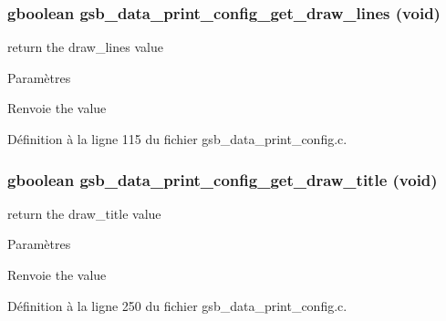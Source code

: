 \subsubsection[{gsb\_\-data\_\-print\_\-config\_\-get\_\-draw\_\-lines}]{\setlength{\rightskip}{0pt plus 5cm}gboolean gsb\_\-data\_\-print\_\-config\_\-get\_\-draw\_\-lines (void)}\label{gsb__data__print__config_8c_a6214f4edbeb618543155d93c1440fb13}
return the draw\_\-lines value


\begin{DoxyParams}{Paramètres}
\item[{\em }]\end{DoxyParams}
\begin{DoxyReturn}{Renvoie}
the value 
\end{DoxyReturn}


Définition à la ligne 115 du fichier gsb\_\-data\_\-print\_\-config.c.

\subsubsection[{gsb\_\-data\_\-print\_\-config\_\-get\_\-draw\_\-title}]{\setlength{\rightskip}{0pt plus 5cm}gboolean gsb\_\-data\_\-print\_\-config\_\-get\_\-draw\_\-title (void)}\label{gsb__data__print__config_8c_afd8a78e043b717e6bc2a6a18b6ced76d}
return the draw\_\-title value


\begin{DoxyParams}{Paramètres}
\item[{\em }]\end{DoxyParams}
\begin{DoxyReturn}{Renvoie}
the value 
\end{DoxyReturn}


Définition à la ligne 250 du fichier gsb\_\-data\_\-print\_\-config.c.

